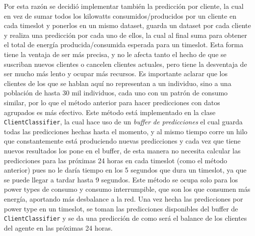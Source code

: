 Por esta razón se decidió implementar también la predicción por cliente, la cual en vez de sumar todos los kilowatts consumidos/producidos por un cliente en cada timeslot y ponerlos en un mismo dataset, guarda un dataset por cada cliente y realiza una predicción por cada uno de ellos, la cual al final suma para obtener el total de energía producida/consumida esperada para un timeslot. 
Esta forma tiene la ventaja de ser más precisa, y no le afecta tanto el hecho de que se suscriban nuevos clientes o cancelen clientes actuales, pero tiene la desventaja de ser mucho más lento y ocupar más recursos. 
Es importante aclarar que los clientes de los que se hablan aquí no representan a un individuo, sino a una población de hasta 30 mil individuos, cada uno con un patrón de consumo similar, por lo que el método anterior para hacer predicciones con datos agrupados es más efectivo.
Este método está implementado en la clase \texttt{ClientClassifier}, la cual hace uso de un \textit{buffer de predicciones} el cual guarda todas las predicciones hechas hasta el momento, y al mismo tiempo corre un hilo que constantemente está produciendo nuevas predicciones y cada vez que tiene nuevos resultados los pone en el buffer, de esta manera no necesita calcular las predicciones para las próximas 24 horas en cada timeslot (como el método anterior) pues no le daría tiempo en los 5 segundos que dura un timeslot, ya que se puede llegar a tardar hasta 9 segundos. Este método se ocupa solo para los power types de consumo y consumo interrumpible, que son los que consumen más energía, aportando más desbalance a la red.
Una vez hecha las predicciones por power type en un timeslot, se toman las predicciones disponibles del buffer de \texttt{ClientClassifier} y se da una predicción de como será el balance de los clientes del agente en las próximas 24 horas.


